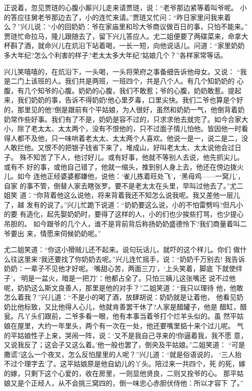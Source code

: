 正说着，忽见贾琏的心腹小厮兴儿走来请贾琏，说：“老爷那边紧等着叫爷呢。
小的答应往舅老爷那边去了，小的连忙来请。”贾琏又忙问：“昨日家里问我来着
么？”兴儿说：“小的回奶奶：爷在家庙里和珍大爷商议做百日的事，只怕不能来。”
贾琏忙命拉马，隆儿跟随去了，留下兴儿答应人。尤二姐便要了两碟菜来，命拿大
杯斟了酒，就命兴儿在炕沿下站着喝，一长一短，向他说话儿。问道：“家里奶奶
多大年纪?怎么个利害的样子?老太太多大年纪?姑娘几个？”各样家常等话。

兴儿笑嘻嘻的，在炕沿下，一头喝，一头将荣府之事备细告诉他母女。又说：
“我是二门上该班的人。我们共是两班，一班四个，共是八个人。有几个知奶奶的
心腹，有几个知爷的心腹。奶奶的心腹，我们不敢惹；爷的心腹，奶奶敢惹。提起
来，我们奶奶的事，告诉不得奶奶!他心里歹毒，口里尖快。我们二爷也算是个好
的，那里见的他?倒是跟前有个平姑娘，为人很好，虽然和奶奶一气，他倒背着奶
奶常作些好事。我们有了不是，奶奶是容不过的，只求求他去就完了。如今合家大
小，除了老太太、太太两个，没有不恨他的，只不过面子情儿怕他。皆因他一时看
得人都不及他，只一味哄着老太太、太太两个人喜欢。他说一是一，说二是二，没
人敢拦他。又恨不的把银子钱省下来了，堆成山，好叫老太太、太太说他会过日子。
殊不知苦了下人，他讨好儿。或有好事，他就不等别人去说，他先抓尖儿。或有不
好的事，或他自己错了，他就一缩头，推到别人身上去，他还在傍边拨火儿。如今
连他正经婆婆都嫌他，说他：‘雀儿拣着旺处飞’，‘黑母鸡——一窝儿’，自家
的事不管，倒替人家去瞎张罗。要不是老太太在头里，早叫过他去了。”尤二姐笑
道：“你背着他这么说他，将来背着我还不知怎么说我呢。我又差他一层儿了，越
发有的说了。”兴儿忙跪下说道：“奶奶要这么说，小的不怕雷劈吗?但凡小的要
有造化，起先娶奶奶时，要得了这样的人，小的们也少挨些打骂，也少提心吊胆的。
如今跟爷的几个人，谁不是背前背后称扬奶奶盛德怜下?我们商量着叫二爷要出
来，情愿来伺候奶奶呢。”

尤二姐笑道：“你这小猾贼儿还不起来。说句玩话儿，就吓的这个样儿。你们
做什么往这里来?我还要找了你奶奶去呢。”兴儿连忙摇手，说：“奶奶千万别去!
我告诉奶奶：一辈子不见他才好呢。‘嘴甜心苦，两面三刀’，‘上头笑着，脚底
下就使绊子’，‘明是一盆火，暗是一把刀’：他都占全了。只怕三姨儿这张嘴还
说不过他呢，奶奶这么斯文良善人，那里是他的对手？”二姐笑道：“我只以理待
他，他敢怎么着我？”兴儿道：“不是小的喝了酒，放肆胡说：奶奶就是让着他，
他看见奶奶比他标致，又比他得人心儿，他就肯善罢干休了?人家是醋罐子，他是
醋缸，醋瓮。凡丫头们跟前，二爷多看一眼，他有本事当着爷打个烂羊头似的。虽
然平姑娘在屋里，大约一年里头，两个有一次在一处，他还要嘴里掂十来个过儿呢。
气的平姑娘性子上来，哭闹一阵，说：‘又不是我自己寻来的!你逼着我，我不愿
意，又说我反了；这会子又这么着。’他一般也罢了，倒央及平姑娘。”二姐笑道：
“可是撒谎?这么一个夜叉，怎么反怕屋里的人呢？”兴儿道：“就是俗语说的，
‘三人抬不过个理字去’了。这平姑娘原是他自幼儿的丫头。陪过来一共四个，死
的死，嫁的嫁，只剩下这个心爱的，收在房里，一则显他贤良，二则又拴爷的心。
那平姑娘又是个正经人，从不会挑三窝四的，倒一味忠心赤胆伏侍他：所以才容下
了。”


